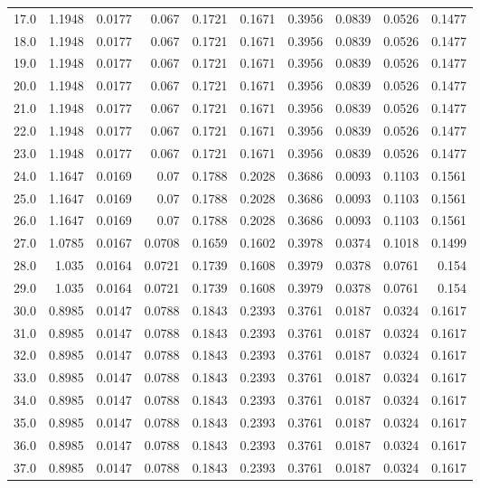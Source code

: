 \begin{longtable}{lrrrrrrrrr}
17.0 & 1.1948 & 0.0177 & 0.067 & 0.1721 & 0.1671 & 0.3956 & 0.0839 & 0.0526 & 0.1477 \\
18.0 & 1.1948 & 0.0177 & 0.067 & 0.1721 & 0.1671 & 0.3956 & 0.0839 & 0.0526 & 0.1477 \\
19.0 & 1.1948 & 0.0177 & 0.067 & 0.1721 & 0.1671 & 0.3956 & 0.0839 & 0.0526 & 0.1477 \\
20.0 & 1.1948 & 0.0177 & 0.067 & 0.1721 & 0.1671 & 0.3956 & 0.0839 & 0.0526 & 0.1477 \\
21.0 & 1.1948 & 0.0177 & 0.067 & 0.1721 & 0.1671 & 0.3956 & 0.0839 & 0.0526 & 0.1477 \\
22.0 & 1.1948 & 0.0177 & 0.067 & 0.1721 & 0.1671 & 0.3956 & 0.0839 & 0.0526 & 0.1477 \\
23.0 & 1.1948 & 0.0177 & 0.067 & 0.1721 & 0.1671 & 0.3956 & 0.0839 & 0.0526 & 0.1477 \\
24.0 & 1.1647 & 0.0169 & 0.07 & 0.1788 & 0.2028 & 0.3686 & 0.0093 & 0.1103 & 0.1561 \\
25.0 & 1.1647 & 0.0169 & 0.07 & 0.1788 & 0.2028 & 0.3686 & 0.0093 & 0.1103 & 0.1561 \\
26.0 & 1.1647 & 0.0169 & 0.07 & 0.1788 & 0.2028 & 0.3686 & 0.0093 & 0.1103 & 0.1561 \\
27.0 & 1.0785 & 0.0167 & 0.0708 & 0.1659 & 0.1602 & 0.3978 & 0.0374 & 0.1018 & 0.1499 \\
28.0 & 1.035 & 0.0164 & 0.0721 & 0.1739 & 0.1608 & 0.3979 & 0.0378 & 0.0761 & 0.154 \\
29.0 & 1.035 & 0.0164 & 0.0721 & 0.1739 & 0.1608 & 0.3979 & 0.0378 & 0.0761 & 0.154 \\
30.0 & 0.8985 & 0.0147 & 0.0788 & 0.1843 & 0.2393 & 0.3761 & 0.0187 & 0.0324 & 0.1617 \\
31.0 & 0.8985 & 0.0147 & 0.0788 & 0.1843 & 0.2393 & 0.3761 & 0.0187 & 0.0324 & 0.1617 \\
32.0 & 0.8985 & 0.0147 & 0.0788 & 0.1843 & 0.2393 & 0.3761 & 0.0187 & 0.0324 & 0.1617 \\
33.0 & 0.8985 & 0.0147 & 0.0788 & 0.1843 & 0.2393 & 0.3761 & 0.0187 & 0.0324 & 0.1617 \\
34.0 & 0.8985 & 0.0147 & 0.0788 & 0.1843 & 0.2393 & 0.3761 & 0.0187 & 0.0324 & 0.1617 \\
35.0 & 0.8985 & 0.0147 & 0.0788 & 0.1843 & 0.2393 & 0.3761 & 0.0187 & 0.0324 & 0.1617 \\
36.0 & 0.8985 & 0.0147 & 0.0788 & 0.1843 & 0.2393 & 0.3761 & 0.0187 & 0.0324 & 0.1617 \\
37.0 & 0.8985 & 0.0147 & 0.0788 & 0.1843 & 0.2393 & 0.3761 & 0.0187 & 0.0324 & 0.1617 \\

\end{longtable}
